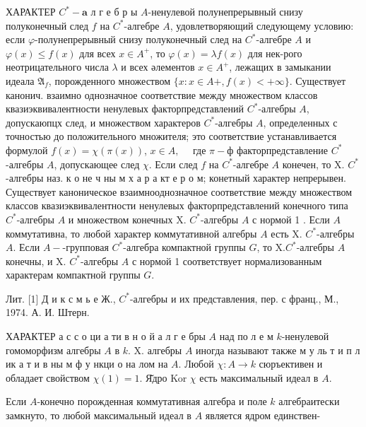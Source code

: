 \documentclass[10pt]{article}
\begin{document}
ХАРАКТЕР $C^{*}-\mathbf{a}$ л г е б р ы $A$-ненулевой полунепрерывный снизу полуконечный след $f$ на $C^{*}$-алгебре $A$, удовлетворяющий следующему условию: если $\varphi$-полунепрерывный снизу полуконечный след на $C^{*}$-алгебре $A$ и $\varphi(x) \leqslant f(x)$ для всех $x \in A^{+}$, то $\varphi(x)=\lambda f(x)$ для нек-рого неотрицательного числа $\lambda$ и всех әлементов $x \in A^{+}$, лежащих в замыкании идеала $\mathfrak{A}_{f}$, порожденного множеством $\{x: x \in A+, f(x)<+\infty\}$. Существует канонич. взаимно однозначное соответствие между множеством классов квазиэквивалентности ненулевых факторпредставлений $C^{*}$-алгебры $A$, допускаюпцх след, и множеством характеров $C^{*}$-алгебры $A$, определенных с точностью до положительного множителя; это соответствие устанавливается формулой $f(x)=\chi(\pi(x))$, $x \in A, \quad$ где $\pi-ф$ факторпредставление $C^{*}$-алгебры $A$, допускающее след $\chi$. Если след $f$ на $C^{*}$-алгебре $A$ конечен, то X. $C^{*}$-алгебры наз. к о не ч ны м х а р а кт е р о м; конетный характер непрерывен. Существует каноническое взаимнооднозначное соответствие между множеством классов квазиэквивалентности ненулевых факторпредставлений конечного типа $C^{*}$-алгебры $A$ и множеством конечных $\mathrm{X}$. $C^{*}$-алгебры $A$ с нормой 1 . Если $A$ коммутативна, то любой характер коммутативной алгебры $A$ есть X. $C^{*}$-алгебры $A$. Если $A-$-групповая $C^{*}$-алгебра компактной группы $G$, то $\mathrm{X} . C^{*}$-алгебры $A$ конечны, и $\mathrm{X}$. $C^{*}$-алгебры $A$ с нормой 1 соответствует нормализованным характерам компактной группы $G$.



Лит. [1] Д и к с м ь е Ж., $C^{*}$-алгебры и их представления, пер. с франц., М., 1974. А. И. Штерн.



ХАРАКТЕР а с с о ци а ти в н о й а л г е бры $A$ над по л е м $k$-ненулевой гомоморфизм алгебры $A$ в $k$. X. алгебры $A$ иногда называют также м у ль т и п л ик а т и в ны м ф у нкци о на лом на $A$. Любой $\chi: A \longrightarrow k$ сюръективен и обладает свойством $\chi(1)=1$. Я̆дро Kor $\chi$ есть максимальный идеал в $A$.



Если $A$-конечно порожденная коммутативная алгебра и поле $k$ алгебраитески замкнуто, то любой максимальный идеал в $A$ является ядром единствен-
\end{document}
